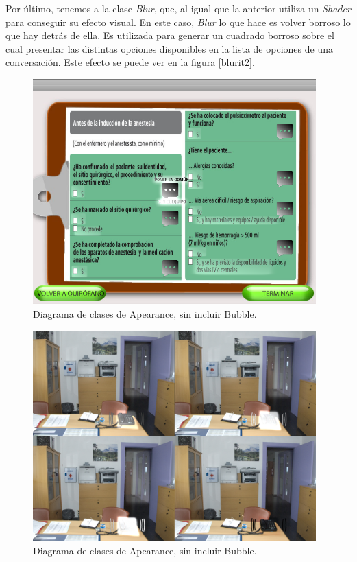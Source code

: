 Por último, tenemos a la clase \textit{Blur}, que, al igual que la anterior utiliza un \textit{Shader} para conseguir su efecto visual. En este caso, \textit{Blur} lo que hace es volver borroso lo que hay detrás de ella. Es utilizada para generar un cuadrado borroso sobre el cual presentar las distintas opciones disponibles en la lista de opciones de una conversación. Este efecto se puede ver en la figura \ref{blurit2}.

\begin{figure}[h!]
	\centerline{\includegraphics[width=4.3in]{figures/it2/apearance/checklist.png}}
	\caption[Apearance - Versión Final]{Diagrama de clases de Apearance, sin incluir Bubble.}
	\label{autoglow1it2}
\end{figure}

\begin{figure}[h!]
	\centerline{\includegraphics[width=4.3in]{figures/it2/apearance/fire.png}}
	\caption[Apearance - Versión Final]{Diagrama de clases de Apearance, sin incluir Bubble.}
	\label{autoglow2it2}
\end{figure}

